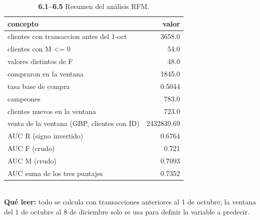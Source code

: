 \begin{table}[htbp]
\centering
\footnotesize
\caption{\textbf{6.1--6.5} Resumen del an\'alisis RFM.}
\label{tab:p6_resumen}
\begin{tabular}{lr}
\toprule
\textbf{concepto} & \textbf{valor} \\
\midrule
clientes con transaccion antes del 1-oct & 3658.0 \\
clientes con M <= 0 & 54.0 \\
valores distintos de F & 48.0 \\
compraron en la ventana & 1845.0 \\
tasa base de compra & 0.5044 \\
campeones & 783.0 \\
clientes nuevos en la ventana & 723.0 \\
venta de la ventana (GBP, clientes con ID) & 2432839.69 \\
AUC R (signo invertido) & 0.6764 \\
AUC F (crudo) & 0.721 \\
AUC M (crudo) & 0.7093 \\
AUC suma de los tres puntajes & 0.7352 \\
\bottomrule
\end{tabular}
\\[0.3em]{\scriptsize \textbf{Qu\'e leer:} todo se calcula con transacciones anteriores al 1 de octubre; la ventana del 1 de octubre al 8 de diciembre solo se usa para definir la variable a predecir.}
\end{table}
